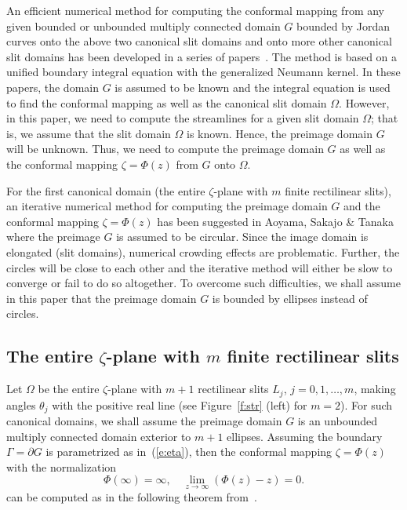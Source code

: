 \documentclass[11pt,a4paper]{article}
\begin{document}
An efficient numerical method for computing the conformal mapping from any given bounded or unbounded multiply connected domain $G$ bounded by Jordan curves onto the above two canonical slit domains and onto more other canonical slit domains has been developed in a series of papers~\cite{Nas-CMFT09,Nas-SIAM09,Nas-JMAA11,Nas-JMAA13}. The method is based on a unified boundary integral equation with the generalized Neumann kernel. In these papers, the domain $G$ is assumed to be known and the integral equation is used to find the conformal mapping as well as the canonical slit domain $\Omega$. 
However, in this paper, we need to compute the streamlines for a given slit domain $\Omega$; that is, we assume that the slit domain $\Omega$ is known. Hence, the preimage domain $G$ will be unknown. Thus, we need to compute the preimage domain $G$ as well as the conformal mapping $\zeta=\Phi(z)$ from $G$ onto $\Omega$.

For the first canonical domain (the entire $\zeta$-plane with $m$ finite rectilinear slits), an iterative numerical method for computing the preimage domain $G$ and the conformal mapping $\zeta=\Phi(z)$ has been suggested in Aoyama, Sakajo \& Tanaka~\cite{Aoy-Sak-Tan13} where the preimage $G$ is assumed to be circular. Since the image domain is elongated (slit domains), numerical crowding effects are problematic. Further, the circles will be close to each other and the iterative method will either be slow to converge or fail to do so altogether. To overcome such difficulties, we shall assume in this paper that the preimage domain $G$ is bounded by ellipses instead of circles. 

\subsection{The entire $\zeta$-plane with $m$ finite rectilinear slits}
\label{sc:rec}

Let $\Omega$ be the entire $\zeta$-plane with $m+1$ rectilinear slits $L_j$, $j=0,1,\ldots,m$, making angles $\theta_j$ with the positive real line (see Figure~\ref{f:str} (left) for $m=2$). For such canonical domains, we shall assume the preimage domain $G$ is an unbounded multiply connected domain exterior to $m+1$ ellipses. Assuming the boundary $\Gamma=\partial G$ is parametrized as in~(\ref{e:eta}), then the conformal mapping $\zeta=\Phi(z)$ with the normalization
\[
\Phi(\infty)=\infty, \quad \lim_{z\to\infty}(\Phi(z)-z)=0.
\]
can be computed as in the following theorem from~\cite{Nas-JMAA11}.
\end{document}
